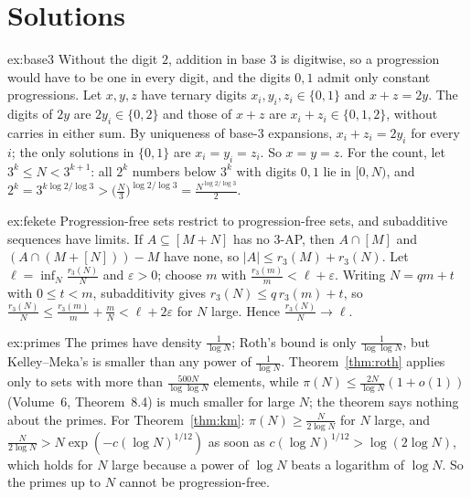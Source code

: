 \section{Solutions}

\begin{solution}{ex:base3}
\idea Without the digit $2$, addition in base $3$ is digitwise, so a progression would have to be one in every digit, and the digits $0,1$ admit only constant progressions.
\writeup Let $x,y,z$ have ternary digits $x_i,y_i,z_i\in\{0,1\}$ and $x+z=2y$. The digits of $2y$ are $2y_i\in\{0,2\}$ and those of $x+z$ are $x_i+z_i\in\{0,1,2\}$, without carries in either sum. By uniqueness of base-$3$ expansions, $x_i+z_i=2y_i$ for every $i$; the only solutions in $\{0,1\}$ are $x_i=y_i=z_i$. So $x=y=z$. For the count, let $3^k\le N<3^{k+1}$: all $2^k$ numbers below $3^k$ with digits $0,1$ lie in $[0,N)$, and $2^k=3^{k\log2/\log3}>\bigl(\frac N3\bigr)^{\log2/\log3}=\frac{N^{\log2/\log3}}2$.
\end{solution}

\begin{solution}{ex:fekete}
\idea Progression-free sets restrict to progression-free sets, and subadditive sequences have limits.
\writeup If $A\subseteq[M+N]$ has no $3$-AP, then $A\cap[M]$ and $(A\cap(M+[N]))-M$ have none, so $|A|\le r_3(M)+r_3(N)$. Let $\ell=\inf_N\frac{r_3(N)}N$ and $\varepsilon>0$; choose $m$ with $\frac{r_3(m)}m<\ell+\varepsilon$. Writing $N=qm+t$ with $0\le t<m$, subadditivity gives $r_3(N)\le q\,r_3(m)+t$, so $\frac{r_3(N)}N\le\frac{r_3(m)}m+\frac mN<\ell+2\varepsilon$ for $N$ large. Hence $\frac{r_3(N)}N\to\ell$.
\end{solution}

\begin{solution}{ex:primes}
\idea The primes have density $\frac1{\log N}$; Roth's bound is only $\frac1{\log\log N}$, but Kelley--Meka's is smaller than any power of $\frac1{\log N}$.
\writeup Theorem~\ref{thm:roth} applies only to sets with more than $\frac{500N}{\log\log N}$ elements, while $\pi(N)\le\frac{2N}{\log N}(1+o(1))$ (Volume~6, Theorem~8.4) is much smaller for large $N$; the theorem says nothing about the primes. For Theorem~\ref{thm:km}: $\pi(N)\ge\frac N{2\log N}$ for $N$ large, and $\frac N{2\log N}>N\exp(-c(\log N)^{1/12})$ as soon as $c(\log N)^{1/12}>\log(2\log N)$, which holds for $N$ large because a power of $\log N$ beats a logarithm of $\log N$. So the primes up to $N$ cannot be progression-free.
\end{solution}

